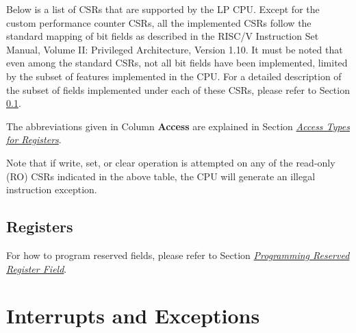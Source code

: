 \documentclass[main\_\_EN.tex]{subfiles}
\begin{document}
Below is a list of CSRs that are supported by the LP CPU. Except for the custom performance counter CSRs, all the implemented CSRs follow the standard mapping of bit fields as described in the RISC\-/V Instruction Set Manual, Volume II: Privileged Architecture, Version 1.10. It must be noted that even among the standard CSRs, not all bit fields have been implemented, limited by the subset of features implemented in the CPU. For a detailed description of the subset of fields implemented under each of these CSRs, please refer to Section \ref{sec:ulp-reg}.

The abbreviations given in Column \textbf{Access} are explained in Section \hyperref[glossary-access-types]{\textit{Access Types for Registers}}.



Note that if write, set, or clear operation is attempted on any of the read-only (RO) CSRs indicated in the above table, the CPU will generate an illegal instruction exception.

\subsection{Registers}
\label{sec:ulp-reg}

For how to program reserved fields, please refer to Section \hyperref[programming-reserved-field]{\textit{Programming Reserved Register Field}}.




\section{Interrupts and Exceptions}
\end{document}
